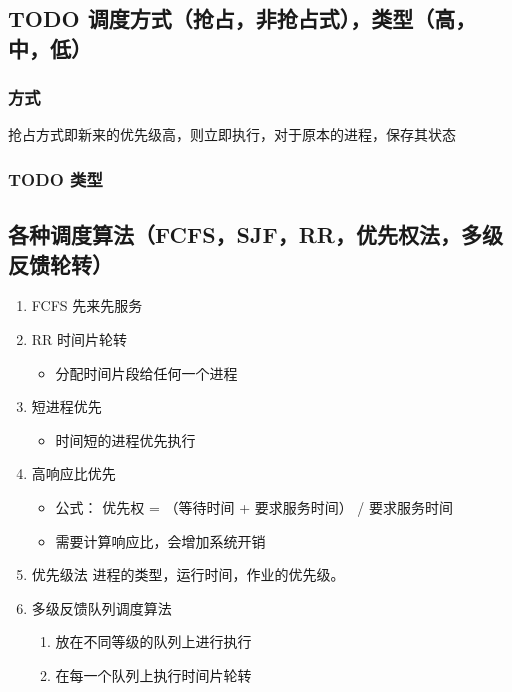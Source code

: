 \documentclass[11pt]{article}
\begin{document}
\subsection{{\bfseries\sffamily TODO} 调度方式（抢占，非抢占式），类型（高，中，低）}
\label{sec-2-11}
\subsubsection{方式}
\label{sec-2-11-1}
抢占方式即新来的优先级高，则立即执行，对于原本的进程，保存其状态
\subsubsection{{\bfseries\sffamily TODO} 类型}
\label{sec-2-11-2}
\subsection{各种调度算法（FCFS，SJF，RR，优先权法，多级反馈轮转）}
\label{sec-2-12}
\begin{enumerate}
\item FCFS 先来先服务
\label{sec-2-12-0-1}
\item RR 时间片轮转
\label{sec-2-12-0-2}
\begin{itemize}
\item 分配时间片段给任何一个进程
\end{itemize}
\item 短进程优先
\label{sec-2-12-0-3}
\begin{itemize}
\item 时间短的进程优先执行
\end{itemize}
\item 高响应比优先
\label{sec-2-12-0-4}
\begin{itemize}
\item 公式： 优先权 = （等待时间 + 要求服务时间） / 要求服务时间
\item 需要计算响应比，会增加系统开销
\end{itemize}

\item 优先级法
\label{sec-2-12-0-5}
进程的类型，运行时间，作业的优先级。
\item 多级反馈队列调度算法
\label{sec-2-12-0-6}
\begin{enumerate}
\item 放在不同等级的队列上进行执行
\item 在每一个队列上执行时间片轮转
\end{enumerate}
\end{enumerate}
\end{document}
